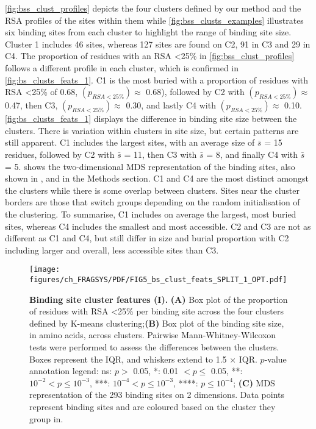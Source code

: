 \autoref{fig:bss_clust_profiles} depicts the four clusters defined by our method and the RSA profiles of the sites within them while \autoref{fig:bss_clusts_examples} illustrates six binding sites from each cluster to highlight the range of binding site size. Cluster 1 includes 46 sites, whereas 127 sites are found on C2, 91 in C3 and 29 in C4. The proportion of residues with an RSA \textless 25\% in \autoref{fig:bss_clust_profiles} follows a different profile in each cluster, which is confirmed in \autoref{fig:bs_clusts_feats_1}. C1 is the most buried with a proportion of residues with RSA \textless 25\% of 0.68, $(p_{RSA<25\%}) \approx$ 0.68), followed by C2 with $(p_{RSA<25\%}) \approx$ 0.47, then C3, $(p_{RSA<25\%}) \approx$ 0.30, and lastly C4 with $(p_{RSA<25\%}) \approx$ 0.10. \autoref{fig:bs_clusts_feats_1} displays the difference in binding site size between the clusters. There is variation within clusters in site size, but certain patterns are still apparent. C1 includes the largest sites, with an average size of $\bar{s}$ = 15 residues, followed by C2 with $\bar{s}$ = 11, then C3 with $\bar{s}$ = 8, and finally C4 with $\bar{s}$ = 5.  shows the two-dimensional MDS representation of the binding sites, also shown in , and  in the Methods section. C1 and C4 are the most distinct amongst the clusters while there is some overlap between clusters. Sites near the cluster borders are those that switch groups depending on the random initialisation of the clustering. To summarise, C1 includes on average the largest, most buried sites, whereas C4 includes the smallest and most accessible. C2 and C3 are not as different as C1 and C4, but still differ in size and burial proportion with C2 including larger and overall, less accessible sites than C3.

\begin{figure}[ht!]
    \centering
    \texttt{[image: figures/ch\_FRAGSYS/PDF/FIG5\_bs\_clust\_feats\_SPLIT\_1\_OPT.pdf]}
    \caption[Binding site cluster features (I)]{\textbf{Binding site cluster features (I).} \textbf{(A)} Box plot of the proportion of residues with RSA \textless 25\% per binding site across the four clusters defined by K-means clustering;\textbf{(B)} Box plot of the binding site size, in amino acids, across clusters. Pairwise Mann-Whitney-Wilcoxon tests were performed to assess the differences between the clusters. Boxes represent the IQR, and whiskers extend to 1.5 $\times$ IQR. $p$-value annotation legend: ns: $p >$ 0.05, *: 0.01 $< p \leq$ 0.05, **: $10^{-2} < p \leq 10^{-3}$, ***: $10^{-4} < p \leq 10^{-3}$, ****: $p \leq 10^{-4}$; \textbf{(C)} MDS representation of the 293 binding sites on 2 dimensions. Data points represent binding sites and are coloured based on the cluster they group in.}
    \label{fig:bs_clusts_feats_1}
\end{figure}

